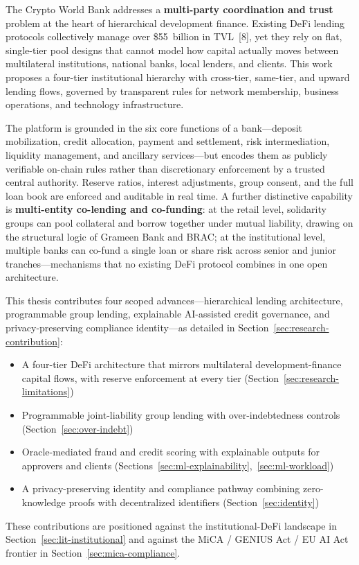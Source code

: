 \documentclass[12pt, a4paper]{report}
\begin{document}
The Crypto World Bank addresses a \textbf{multi-party coordination and trust} problem at the heart of hierarchical development finance. Existing DeFi lending protocols collectively manage over \$55~billion in TVL~[8], yet they rely on flat, single-tier pool designs that cannot model how capital actually moves between multilateral institutions, national banks, local lenders, and clients. This work proposes a four-tier institutional hierarchy with cross-tier, same-tier, and upward lending flows, governed by transparent rules for network membership, business operations, and technology infrastructure.

The platform is grounded in the six core functions of a bank---deposit mobilization, credit allocation, payment and settlement, risk intermediation, liquidity management, and ancillary services---but encodes them as publicly verifiable on-chain rules rather than discretionary enforcement by a trusted central authority. Reserve ratios, interest adjustments, group consent, and the full loan book are enforced and auditable in real time. A further distinctive capability is \textbf{multi-entity co-lending and co-funding}: at the retail level, solidarity groups can pool collateral and borrow together under mutual liability, drawing on the structural logic of Grameen Bank and BRAC; at the institutional level, multiple banks can co-fund a single loan or share risk across senior and junior tranches---mechanisms that no existing DeFi protocol combines in one open architecture.

This thesis contributes four scoped advances---hierarchical lending architecture, programmable group lending, explainable AI-assisted credit governance, and privacy-preserving compliance identity---as detailed in Section~\ref{sec:research-contribution}:
\begin{itemize}[noitemsep]
\item A four-tier DeFi architecture that mirrors multilateral development-finance capital flows, with reserve enforcement at every tier (Section~\ref{sec:research-limitations})
\item Programmable joint-liability group lending with over-indebtedness controls (Section~\ref{sec:over-indebt})
\item Oracle-mediated fraud and credit scoring with explainable outputs for approvers and clients (Sections~\ref{sec:ml-explainability},~\ref{sec:ml-workload})
\item A privacy-preserving identity and compliance pathway combining zero-knowledge proofs with decentralized identifiers (Section~\ref{sec:identity})
\end{itemize}
These contributions are positioned against the institutional-DeFi landscape in Section~\ref{sec:lit-institutional} and against the MiCA / GENIUS Act / EU AI Act frontier in Section~\ref{sec:mica-compliance}.
\end{document}
